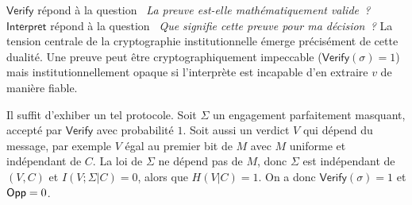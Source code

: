 \begin{sloppypar}
\begin{remark}\label{rem:double_couche}
$\mathsf{Verify}$ r\'epond \`a la question \emph{\guillemotleft~La preuve est-elle math\'ematiquement
valide~?\guillemotright} $\mathsf{Interpret}$ r\'epond \`a la question \emph{\guillemotleft~Que signifie cette
preuve pour ma d\'ecision~?\guillemotright} La tension centrale de la cryptographie
institutionnelle \'emerge pr\'ecis\'ement de cette dualit\'e. Une preuve peut
\^etre cryptographiquement impeccable ($\mathsf{Verify}(\sigma) = 1$) mais
institutionnellement opaque si l'interpr\`ete est incapable d'en extraire
$v$ de mani\`ere fiable.
\end{remark}

\begin{Preuve}
Il suffit d'exhiber un tel protocole. Soit $\Sigma$ un engagement parfaitement
masquant, accept\'e par $\mathsf{Verify}$ avec probabilit\'e $1$. Soit aussi un verdict
$V$ qui d\'epend du message, par exemple $V$ \'egal au premier bit de $M$ avec $M$
uniforme et ind\'ependant de $C$. La loi de $\Sigma$ ne d\'epend pas de $M$, donc
$\Sigma$ est ind\'ependant de $(V,C)$ et $I(V;\Sigma|C) = 0$, alors que
$H(V|C) = 1$. On a donc $\mathsf{Verify}(\sigma) = 1$ et $\mathsf{Opp} = 0$.
\end{Preuve}

\begin{figure}[htbp]
\centering
{}
\end{figure}
\end{sloppypar}
